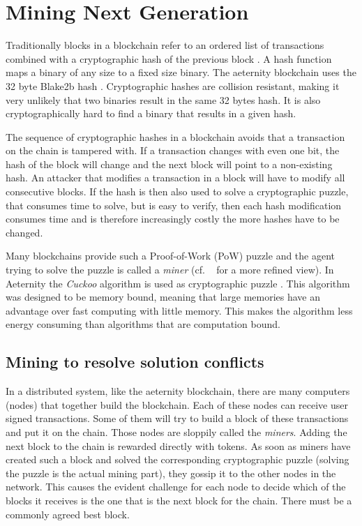\section{Mining Next Generation}
\label{sect:mining}

Traditionally blocks in a blockchain refer to an ordered list of
transactions combined with a cryptographic hash of the previous block
\cite{whatisablockchain,raikwar2019sok}. A hash function maps a
binary of any size to a fixed size binary. The aeternity blockchain
uses the 32 byte Blake2b hash \cite{aumasson2013blake2}. Cryptographic
hashes are collision resistant, making it very unlikely that two binaries
result in the same 32 bytes hash. It is also cryptographically hard
to find a binary that results in a given hash.

The sequence of cryptographic hashes in a blockchain avoids
that a transaction on the chain is tampered with. If a transaction
changes with even one bit, the hash of the block will change and the
next block will point to a non-existing hash. An attacker that
modifies a transaction in a block will have to modify all consecutive
blocks. If the hash is then also used to solve a cryptographic puzzle,
that consumes time to solve, but is easy to verify, then each hash
modification consumes time and is therefore increasingly costly the
more hashes have to be changed.

Many blockchains provide such a Proof-of-Work (PoW) puzzle and the agent
trying to solve the puzzle is called a \textit{miner} (cf. \ \cite{wang2018survey} for a more
refined view).  In Aeternity the \textit{Cuckoo}
algorithm is used as cryptographic puzzle \cite{Tromp2015CuckooCA}. This
algorithm was designed to be memory bound, meaning that large memories
have an advantage over fast computing with little memory. This makes
the algorithm less energy consuming than algorithms that are
computation bound.

\subsection{Mining to resolve solution conflicts}

In a distributed system, like the aeternity blockchain, there are many
computers (nodes) that together build the blockchain. Each of these nodes
can receive user signed transactions. Some of them will try to build a
block of these transactions and put it on the chain. Those nodes are
sloppily called the \textit{miners}. Adding the next
block to the chain is rewarded directly with tokens. As soon as miners
have created such a block and solved the corresponding cryptographic
puzzle (solving the puzzle is the actual mining part), they gossip it
to the other nodes in the network.
This causes the evident challenge for each node to decide  which of the blocks
it receives is the one that is the next block for the chain. There
must be a commonly agreed best block.

